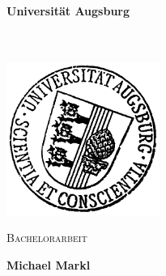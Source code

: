 
\thispagestyle{empty}
\newcommand{\Universitat}{Universität Augsburg}
\begin{titlepage}
  	\begin{center}
		\LARGE \textbf{\Universitat} \\
		\uni \\
		\makebox[0pt]{\text{\lehrstuhl}} \\
	\end{center}
	\vspace*{1em}
	\begin{center}
		\includegraphics[width=5cm,height=5cm]{UNI}
	\end{center}
	
	\vspace*{1em}
	
	\begin{center}
		\Huge\textsc{Bachelorarbeit}
	\end{center}
	
	\vspace*{1cm}
	\ownline
	\begin{center}
	\end{center}
	\ownline
	\vspace*{1cm}
	\begin{center}
		\LARGE\textbf{Michael Markl}
	\end{center}
    \vfill
\end{titlepage}